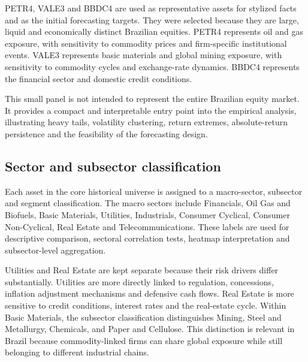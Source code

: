 PETR4, VALE3 and BBDC4 are used as representative assets for stylized facts and as the initial forecasting targets. They were selected because they are large, liquid and economically distinct Brazilian equities. PETR4 represents oil and gas exposure, with sensitivity to commodity prices and firm-specific institutional events. VALE3 represents basic materials and global mining exposure, with sensitivity to commodity cycles and exchange-rate dynamics. BBDC4 represents the financial sector and domestic credit conditions.

This small panel is not intended to represent the entire Brazilian equity market. It provides a compact and interpretable entry point into the empirical analysis, illustrating heavy tails, volatility clustering, return extremes, absolute-return persistence and the feasibility of the forecasting design.

\subsection{Sector and subsector classification}

Each asset in the core historical universe is assigned to a macro-sector, subsector and segment classification. The macro sectors include Financials, Oil Gas and Biofuels, Basic Materials, Utilities, Industrials, Consumer Cyclical, Consumer Non-Cyclical, Real Estate and Telecommunications. These labels are used for descriptive comparison, sectoral correlation tests, heatmap interpretation and subsector-level aggregation.

Utilities and Real Estate are kept separate because their risk drivers differ substantially. Utilities are more directly linked to regulation, concessions, inflation adjustment mechanisms and defensive cash flows. Real Estate is more sensitive to credit conditions, interest rates and the real-estate cycle. Within Basic Materials, the subsector classification distinguishes Mining, Steel and Metallurgy, Chemicals, and Paper and Cellulose. This distinction is relevant in Brazil because commodity-linked firms can share global exposure while still belonging to different industrial chains.

\begin{center}
\label{tab:universe_summary}
\end{center}

